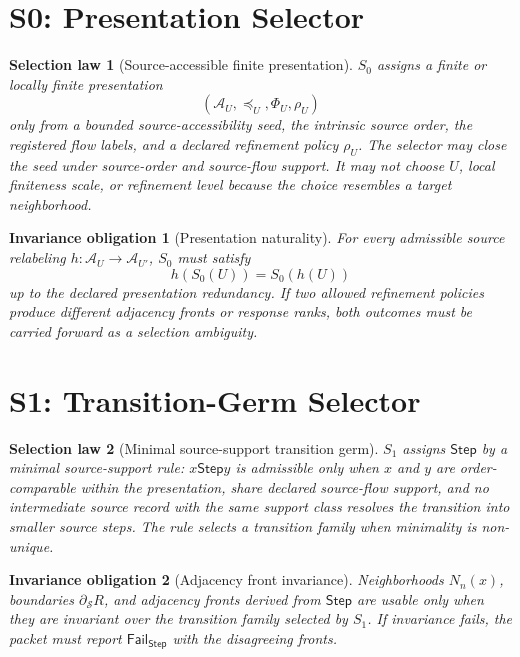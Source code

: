 \documentclass[11pt]{article}
\newcommand{\Sub}{\mathcal{A}}
\newcommand{\Step}{\mathsf{Step}}
\newcommand{\Fail}{\mathsf{Fail}}
\newtheorem{selectionlaw}{Selection law}
\newtheorem{obligation}{Invariance obligation}
\begin{document}
\section{S0: Presentation Selector}

\begin{selectionlaw}[Source-accessible finite presentation]
\(S_0\) assigns a finite or locally finite presentation
\[
(\Sub_U,\preceq_U,\Phi_U,\rho_U)
\]
only from a bounded source-accessibility seed, the intrinsic source order, the
registered flow labels, and a declared refinement policy \(\rho_U\). The
selector may close the seed under source-order and source-flow support. It may
not choose \(U\), local finiteness scale, or refinement level because the
choice resembles a target neighborhood.
\end{selectionlaw}

\begin{obligation}[Presentation naturality]
For every admissible source relabeling \(h:\Sub_U\to\Sub_{U'}\), \(S_0\)
must satisfy
\[
h(S_0(U))=S_0(h(U))
\]
up to the declared presentation redundancy. If two allowed refinement
policies produce different adjacency fronts or response ranks, both outcomes
must be carried forward as a selection ambiguity.
\end{obligation}

\section{S1: Transition-Germ Selector}

\begin{selectionlaw}[Minimal source-support transition germ]
\(S_1\) assigns \(\Step\) by a minimal source-support rule: \(x\Step y\) is
admissible only when \(x\) and \(y\) are order-comparable within the
presentation, share declared source-flow support, and no intermediate source
record with the same support class resolves the transition into smaller
source steps. The rule selects a transition family when minimality is
non-unique.
\end{selectionlaw}

\begin{obligation}[Adjacency front invariance]
Neighborhoods \(N_n(x)\), boundaries \(\partial_{\mathcal{S}}R\), and
adjacency fronts derived from \(\Step\) are usable only when they are
invariant over the transition family selected by \(S_1\). If invariance
fails, the packet must report \(\Fail_{\Step}\) with the disagreeing fronts.
\end{obligation}
\end{document}

